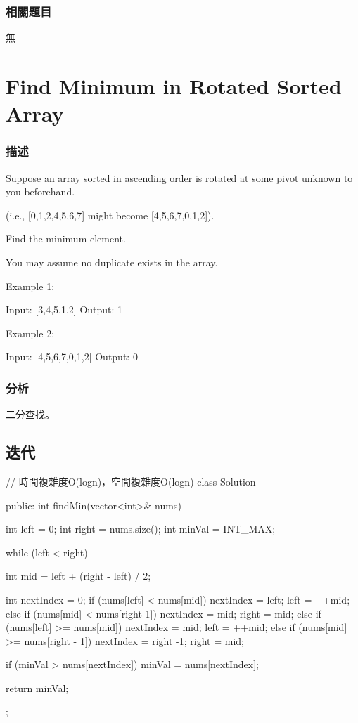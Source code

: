 \subsubsection{相關題目}
\begindot
\item 無
\myenddot

\section{Find Minimum in Rotated Sorted Array} %
\label{sec:find-minium-in-rotated-sorted-array}


\subsubsection{描述}
Suppose an array sorted in ascending order is rotated at some pivot unknown to you beforehand.

(i.e.,  [0,1,2,4,5,6,7] might become  [4,5,6,7,0,1,2]).

Find the minimum element.

You may assume no duplicate exists in the array.

Example 1:
\begin{Code}
Input: [3,4,5,1,2] 
Output: 1
\end{Code}

Example 2:
\begin{Code}
Input: [4,5,6,7,0,1,2]
Output: 0
\end{Code}

\subsubsection{分析}
二分查找。


\subsection{迭代}
\begin{Code}
// 時間複雜度O(logn)，空間複雜度O(logn)
class Solution {
public:
    int findMin(vector<int>& nums) {
        int left = 0;
        int right = nums.size();
        int minVal = INT_MAX;

        while (left < right) {
            int mid = left + (right - left) / 2;

            int nextIndex = 0;
            if (nums[left] < nums[mid]) {
                nextIndex = left;
                left = ++mid;
            }
            else if (nums[mid] < nums[right-1]) {
                nextIndex = mid;
                right = mid;
            }
            else if (nums[left] >= nums[mid]) {
                nextIndex = mid;
                left = ++mid;
            }
            else if (nums[mid] >= nums[right - 1]) {
                nextIndex = right -1;
                right = mid;
            }

            if (minVal > nums[nextIndex])
                minVal = nums[nextIndex];
        }

        return minVal;
    }
};
\end{Code}


